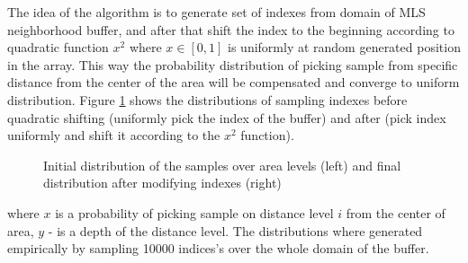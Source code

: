 The idea of the algorithm is to generate set of indexes from domain of MLS neighborhood buffer, and after that shift the index to the beginning according to quadratic function $x^2$ where $x\in [0,1]$ is uniformly at random generated position in the array. This way the probability distribution of picking sample from specific distance from the center of the area will be compensated and converge to uniform distribution. Figure \ref{fig:distributions} shows the distributions of sampling indexes before quadratic shifting (uniformly pick the index of the buffer) and after (pick index uniformly and shift it according to the $x^2$ function).\\
\begin{figure}
	\caption{Initial distribution of the samples over area levels (left) and final distribution after modifying indexes (right)}
	\label{fig:distributions}
\end{figure}
where $x$ is a probability of picking sample on distance level $i$ from the center of area, $y$ - is a depth of the distance level. The distributions where generated empirically by sampling 10000 indices's over the whole domain of the buffer. 
